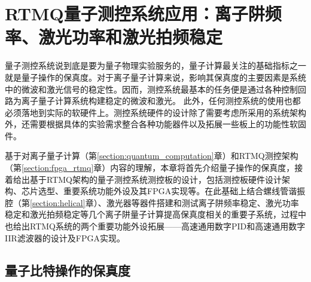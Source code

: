 

\chapter[RTMQ测控系统应用：离子阱频率、激光功率和激光拍频稳定]{RTMQ量子测控系统应用：离子阱频率、激光功率和激光拍频稳定\label{section:implementation}}


量子测控系统说到底是要为量子物理实验服务的，量子计算最关注的基础指标之一就是量子操作的保真度。对于离子量子计算来说，影响其保真度的主要因素是系统中的微波和激光信号的稳定性。因而，测控系统最基本的任务便是通过各种控制回路为离子量子计算系统构建稳定的微波和激光。
此外，任何测控系统的使用也都必须落地到实际的软硬件上。测控系统硬件的设计除了需要考虑所采用的系统架构外，还需要根据具体的实验需求整合各种功能器件以及拓展一些板上的功能性软固件。

基于对离子量子计算（第\ref{section:quantum_computation}章）和RTMQ测控架构（第\ref{section:fpga_rtmq}章）内容的理解，本章将首先介绍量子操作的保真度，接着给出基于RTMQ架构的量子测控系统测控板的设计，包括测控板硬件设计架构、芯片选型、重要系统功能外设及其FPGA实现等。在此基础上结合螺线管谐振腔（第\ref{section:helical}章）、激光器等器件搭建和测试离子阱频率稳定、激光功率稳定和激光拍频稳定等几个离子阱量子计算提高保真度相关的重要子系统，过程中也给出RTMQ系统的两个重要功能外设拓展——高速通用数字PID和高速通用数字IIR滤波器的设计及FPGA实现。






\section[量子比特操作的保真度]{量子比特操作的保真度}


